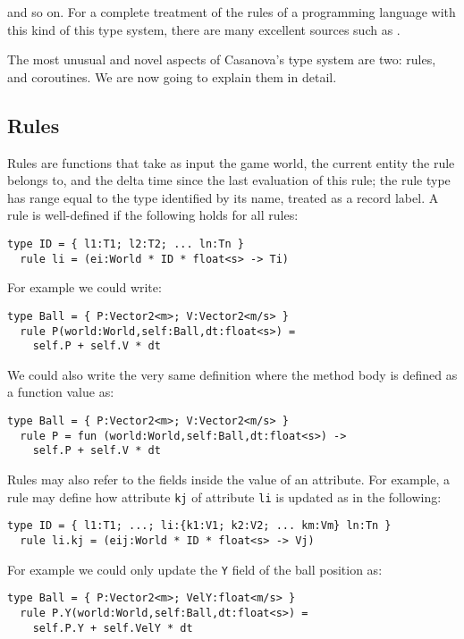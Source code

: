 and so on. For a complete treatment of the rules of a programming language with this kind of this type system, there are many excellent sources such as \cite{CHAPTER_1_PL_INFLUENCE_ON_PL}.

The most unusual and novel aspects of Casanova's type system are two: rules, and coroutines. We are now going to explain them in detail. 

\subsection{Rules}
Rules are functions that take as input the game world, the current entity the rule belongs to, and the delta time since the last evaluation of this rule; the rule type has range equal to the type identified by its name, treated as a record label. A rule is well-defined if the following holds for all rules:

\begin{lstlisting}
type ID = { l1:T1; l2:T2; ... ln:Tn } 
  rule li = (ei:World * ID * float<s> -> Ti)
\end{lstlisting}

For example we could write:

\begin{lstlisting}
type Ball = { P:Vector2<m>; V:Vector2<m/s> } 
  rule P(world:World,self:Ball,dt:float<s>) =
    self.P + self.V * dt
\end{lstlisting}

We could also write the very same definition where the method body is defined as a function value as:

\begin{lstlisting}
type Ball = { P:Vector2<m>; V:Vector2<m/s> } 
  rule P = fun (world:World,self:Ball,dt:float<s>) ->
    self.P + self.V * dt
\end{lstlisting}

Rules may also refer to the fields inside the value of an attribute. For example, a rule may define how attribute \texttt{kj} of attribute \texttt{li} is updated as in the following:

\begin{lstlisting}
type ID = { l1:T1; ...; li:{k1:V1; k2:V2; ... km:Vm} ln:Tn } 
  rule li.kj = (eij:World * ID * float<s> -> Vj)
\end{lstlisting}

For example we could only update the \texttt{Y} field of the ball position as:

\begin{lstlisting}
type Ball = { P:Vector2<m>; VelY:float<m/s> } 
  rule P.Y(world:World,self:Ball,dt:float<s>) =
    self.P.Y + self.VelY * dt
\end{lstlisting}


